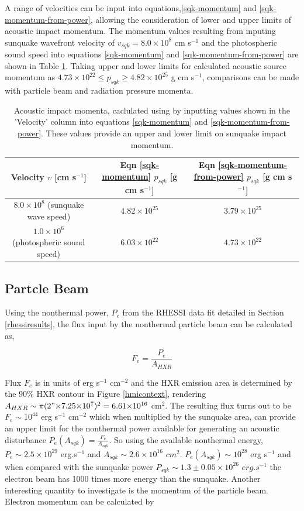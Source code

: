 A range of velocities can be input into equations,\ref{sqk-momentum} and \ref{sqk-momentum-from-power}, allowing the consideration of lower and upper limits of acoustic impact momentum. The momentum values resulting from inputing sunquake wavefront velocity of $v_{sqk} = 8.0{\times}10^{8}$ cm s$^{-1}$ \citep{2014ApJ...796...85J} and the photospheric sound speed into equations \ref{sqk-momentum} and \ref{sqk-momentum-from-power} are shown in Table \ref{sqk-momenta}. Taking upper and lower limits for calculated acoustic source momentum as $4.73{\times}10^{22} \leq p_{sqk} \geq 4.82{\times}10^{25}$ g cm s$^{-1}$, comparisons can be made with particle beam and radiation pressure momenta.\\
\begin{table}[h]
\centering
\begin{tabular}{|c|c|c|}
Velocity $v$ [cm s$^{-1}$] & Eqn \ref{sqk-momentum} $p_{sqk}$ [g cm s$^{-1}$] & Eqn \ref{sqk-momentum-from-power} $p_{sqk}$ [g cm s$^{-1}$]\\
\hline
$8.0{\times}10^{8}$ (sunquake wave speed) & $4.82{\times}10^{25}$ & $3.79{\times}10^{25}$\\
$1.0{\times}10^{6}$ (photospheric sound speed) & $6.03{\times}10^{22}$ & $4.73{\times}10^{22}$\\
\end{tabular}
\caption{Acoustic impact momenta, caclulated using by inputting values shown in the 'Velocity' column into equations \ref{sqk-momentum} and \ref{sqk-momentum-from-power}. These values provide an upper and lower limit on sunquake impact momentum.}\label{sqk-momenta}
\end{table}


\subsection{Partcle Beam}
Using the nonthermal power, $P_{e}$ from the RHESSI data fit detailed in Section \ref{rhessiresults}, the flux input by the nonthermal particle beam can be calculated as,

\begin{equation}\label{electronflux}
F_e = \frac{P_{e}}{A_{HXR}}
\end{equation}

Flux $F_e$ is in units of erg s$^{-1}$ cm$^{-2}$ and the HXR emission area is determined by the $90\%$ HXR contour in Figure \ref{hmicontext}, rendering $A_{HXR} \sim \pi (2"{\times}7.25{\times}10^{7})^{2} = 6.61{\times}10^{16}$ cm$^{2}$. The resulting flux turns out to be $F_e \sim 10^{44}$ erg s$^{-1}$ cm$^{-2}$ which when multiplied by the sunquake area, can provide an upper limit for the nonthermal power available for generating an acoustic disturbance $P_{e}(A_{sqk}) = \frac{F_e}{A_{sqk}}$. So using the available nonthermal energy, $P_e \sim 2.5{\times}10^{29}$ erg.s$^{-1}$ and $A_{sqk} \sim 2.6{\times}10^{16}$ $cm^{2}$. $P_{e}(A_{sqk}) \sim 10^{28}$ erg s$^{-1}$ and when compared with the sunquake power $P_{sqk} \sim 1.3\pm0.05{\times}10^{26}$ $erg.s^{-1}$ the electron beam has 1000 times more energy than the sunquake. Another interesting quantity to investigate is the momentum of the particle beam. Electron momentum can be calculated by 


